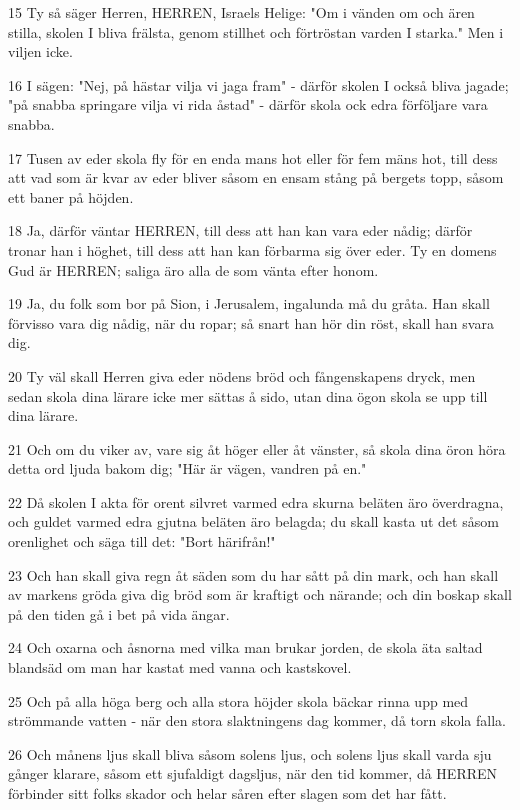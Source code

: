 \par 15 Ty så säger Herren, HERREN, Israels Helige: "Om i vänden om och ären stilla, skolen I bliva frälsta, genom stillhet och förtröstan varden I starka." Men i viljen icke.
\par 16 I sägen: "Nej, på hästar vilja vi jaga fram" - därför skolen I också bliva jagade; "på snabba springare vilja vi rida åstad" - därför skola ock edra förföljare vara snabba.
\par 17 Tusen av eder skola fly för en enda mans hot eller för fem mäns hot, till dess att vad som är kvar av eder bliver såsom en ensam stång på bergets topp, såsom ett baner på höjden.
\par 18 Ja, därför väntar HERREN, till dess att han kan vara eder nådig; därför tronar han i höghet, till dess att han kan förbarma sig över eder. Ty en domens Gud är HERREN; saliga äro alla de som vänta efter honom.
\par 19 Ja, du folk som bor på Sion, i Jerusalem, ingalunda må du gråta. Han skall förvisso vara dig nådig, när du ropar; så snart han hör din röst, skall han svara dig.
\par 20 Ty väl skall Herren giva eder nödens bröd och fångenskapens dryck, men sedan skola dina lärare icke mer sättas å sido, utan dina ögon skola se upp till dina lärare.
\par 21 Och om du viker av, vare sig åt höger eller åt vänster, så skola dina öron höra detta ord ljuda bakom dig; "Här är vägen, vandren på en."
\par 22 Då skolen I akta för orent silvret varmed edra skurna beläten äro överdragna, och guldet varmed edra gjutna beläten äro belagda; du skall kasta ut det såsom orenlighet och säga till det: "Bort härifrån!"
\par 23 Och han skall giva regn åt säden som du har sått på din mark, och han skall av markens gröda giva dig bröd som är kraftigt och närande; och din boskap skall på den tiden gå i bet på vida ängar.
\par 24 Och oxarna och åsnorna med vilka man brukar jorden, de skola äta saltad blandsäd om man har kastat med vanna och kastskovel.
\par 25 Och på alla höga berg och alla stora höjder skola bäckar rinna upp med strömmande vatten - när den stora slaktningens dag kommer, då torn skola falla.
\par 26 Och månens ljus skall bliva såsom solens ljus, och solens ljus skall varda sju gånger klarare, såsom ett sjufaldigt dagsljus, när den tid kommer, då HERREN förbinder sitt folks skador och helar såren efter slagen som det har fått.
